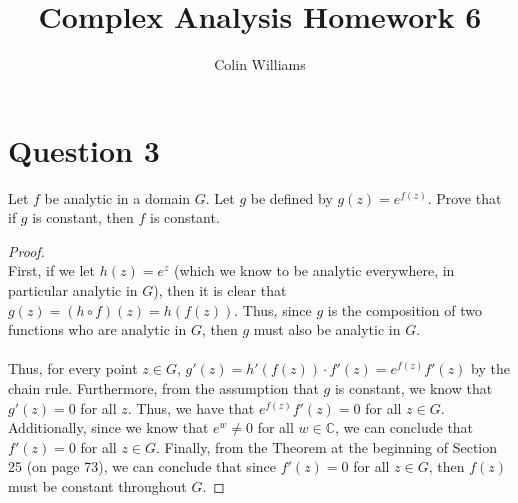 \documentclass[10pt,a4paper]{article}
\title{Complex Analysis Homework 6}
\author{Colin Williams}
\theoremstyle{definition}
\begin{document}
\maketitle

\section*{Question 3}
Let $f$ be analytic in a domain $G$. Let $g$ be defined by $g(z) = e^{f(z)}$. Prove that if $g$ is constant, then $f$ is constant. 

\begin{proof}{$ $ }
\\First, if we let $h(z) = e^z$ (which we know to be analytic everywhere, in particular analytic in $G$), then it is clear that $g(z) = (h \circ f)(z) = h(f(z))$. Thus, since $g$ is the composition of two functions who are analytic in $G$, then $g$ must also be analytic in $G$.
\\
\\Thus, for every point $z \in G$, $g'(z) = h'(f(z))\cdot f'(z) = e^{f(z)}f'(z)$ by the chain rule. Furthermore, from the assumption that $g$ is constant, we know that $g'(z) = 0$ for all $z$. Thus, we have that $e^{f(z)}f'(z) = 0$ for all $z \in G$. Additionally, since we know that $e^w \neq 0$ for all $w \in \mathbb{C}$, we can conclude that $f'(z) = 0$ for all $z \in G$. Finally, from the Theorem at the beginning of Section 25 (on page 73), we can conclude that since $f'(z) = 0$ for all $z \in G$, then $f(z)$ must be constant throughout $G$.

\end{proof}
\end{document}

